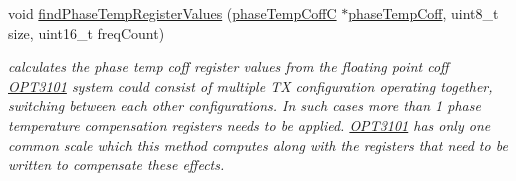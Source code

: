 \begin{DoxyCompactItemize}
void \mbox{\hyperlink{class_o_p_t3101_1_1calibration_add740079c27ba916acbd1b20e7fd8b45}{find\+Phase\+Temp\+Register\+Values}} (\mbox{\hyperlink{class_o_p_t3101_1_1phase_temp_coff_c}{phase\+Temp\+CoffC}} $\ast$\mbox{\hyperlink{class_o_p_t3101_1_1calibration_a15ab9d61ee871815d12cb52c8cd8be55}{phase\+Temp\+Coff}}, uint8\+\_\+t size, uint16\+\_\+t freq\+Count)
\begin{DoxyCompactList}\small\item\em calculates the phase temp coff register values from the floating point coff \mbox{\hyperlink{namespace_o_p_t3101}{O\+P\+T3101}} system could consist of multiple TX configuration operating together, switching between each other configurations. In such cases more than 1 phase temperature compensation registers needs to be applied. \mbox{\hyperlink{namespace_o_p_t3101}{O\+P\+T3101}} has only one common scale which this method computes along with the registers that need to be written to compensate these effects. \end{DoxyCompactList}\end{DoxyCompactItemize}
